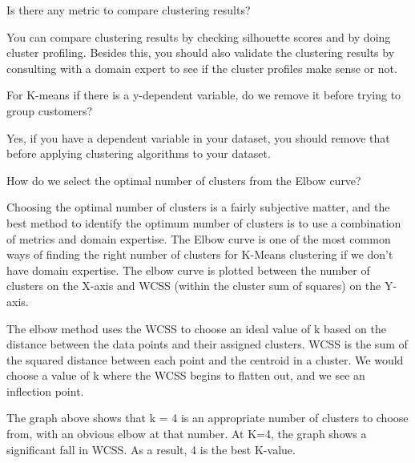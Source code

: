 	\begin{qanda}
		\begin{question}
Is there any metric to compare clustering results?
		\end{question}

		\begin{answer}
You can compare clustering results by checking silhouette scores and by doing cluster profiling. Besides this, you should also validate the clustering results by consulting with a domain expert to see if the cluster profiles make sense or not.
		\end{answer}
	\end{qanda}


	\begin{qanda}
		\begin{question}
For K-means if there is a y-dependent variable, do we remove it before trying to group customers?
		\end{question}

		\begin{answer}
Yes, if you have a dependent variable in your dataset, you should remove that before applying clustering algorithms to your dataset.
		\end{answer}
	\end{qanda}

	\begin{qanda}
		\begin{question}
How do we select the optimal number of clusters from the Elbow curve?
		\end{question}

		\begin{answer}
Choosing the optimal number of clusters is a fairly subjective matter, and the best method to identify the optimum number of clusters is to use a combination of metrics and domain expertise. The Elbow curve is one of the most common ways of finding the right number of clusters for K-Means clustering if we don't have domain expertise. The elbow curve is plotted between the number of clusters on the X-axis and WCSS (within the cluster sum of squares) on the Y-axis.

The elbow method uses the WCSS to choose an ideal value of k based on the distance between the data points and their assigned clusters. WCSS is the sum of the squared distance between each point and the centroid in a cluster. We would choose a value of k where the WCSS begins to flatten out, and we see an inflection point.

The graph above shows that k = 4 is an appropriate number of clusters to choose from, with an obvious elbow at that number. At K=4, the graph shows a significant fall in WCSS. As a result, 4 is the best K-value.
		\end{answer}
	\end{qanda}

